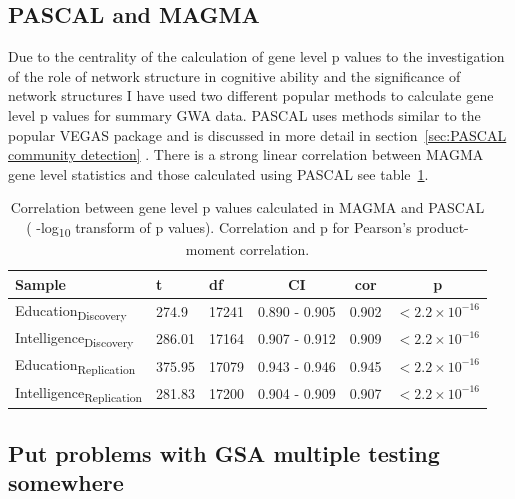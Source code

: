 

\subsection{PASCAL and MAGMA}
Due to the centrality of the calculation of gene level p values to the investigation of the role of network structure in cognitive ability and the significance of network structures I have used two different popular methods to calculate gene level p values for summary GWA data. PASCAL uses methods similar to the popular VEGAS package and is discussed in more detail in section~\ref{sec:PASCAL community detection} \cite{lamparter2016fast} . There is a strong linear correlation between MAGMA gene level statistics and those calculated using PASCAL see table~\ref{tab:correlation MAGMA and PASCAL}. 

\begin{table}[ht]
    \centering
    \begin{tabular}{lllccc}
    \toprule
    Sample & t & df & CI & cor & p \\
    \midrule
      Education\textsubscript{Discovery}   & 274.9 & 17241 & 0.890 - 0.905 & 0.902 & $<2.2 \times 10^{-16}$  \\
       Intelligence\textsubscript{Discovery} &286.01 & 17164 & 0.907 - 0.912 & 0.909 & $<2.2 \times 10^{-16}$\\
      Education\textsubscript{Replication} & 375.95 & 17079 & 0.943 - 0.946 & 0.945 & $<2.2 \times 10^{-16}$ \\
       
        Intelligence\textsubscript{Replication} &281.83 & 17200 & 0.904 - 0.909 & 0.907 &$<2.2 \times 10^{-16}$ \\
        \bottomrule
        \end{tabular}
    \caption{Correlation between gene level p values calculated in MAGMA and PASCAL ( -log\textsubscript{10} transform of p values). Correlation and p for Pearson's product-moment correlation. }
    \label{tab:correlation MAGMA and PASCAL}
\end{table}




\subsection{Put problems with GSA multiple testing somewhere}



